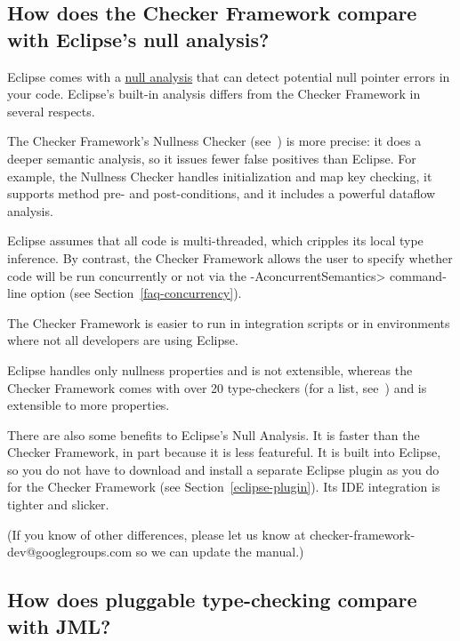 \subsection{How does the Checker Framework compare with Eclipse's null analysis?\label{faq-eclipse}}

Eclipse comes with a
\href{http://help.eclipse.org/luna/index.jsp?topic=\%2Forg.eclipse.jdt.doc.user\%2Ftasks\%2Ftask-using_null_annotations.htm}{null analysis} that
can detect potential null pointer errors in your code.  Eclipse's built-in
analysis differs from the Checker Framework in several respects.

The Checker Framework's Nullness Checker
(see~) is more precise:  it does a deeper
semantic analysis, so it issues fewer false positives than Eclipse.  For
example, the Nullness Checker handles initialization and map key checking,
it supports method pre- and post-conditions, and it includes a powerful
dataflow analysis.

Eclipse assumes that all code is multi-threaded, which cripples its local
type inference.  By contrast, the Checker Framework allows the user to
specify whether code will be run concurrently or not via the
\<-AconcurrentSemantics> command-line option (see
Section~\ref{faq-concurrency}).

The Checker Framework is easier to run in integration scripts or in
environments where not all developers are using Eclipse.

Eclipse handles only nullness properties and is not extensible, whereas the
Checker Framework comes with over 20 type-checkers (for a list,
see~) and is extensible to more properties.

There are also some benefits to Eclipse's Null Analysis.
It is faster than the Checker Framework, in part because it is less featureful.
It is built into Eclipse, so you do not have to download and install a
separate Eclipse plugin as you do for the Checker Framework (see
Section~\ref{eclipse-plugin}).
Its IDE integration is tighter and slicker.

(If you know of other differences, please let us know at
checker-framework-dev@googlegroups.com so we can update the manual.)


\subsection{How does pluggable type-checking compare with JML?\label{faq-jml}}

